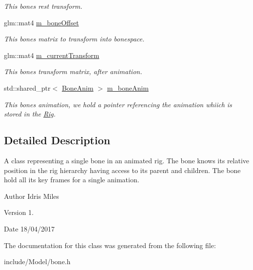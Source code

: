 \begin{DoxyCompactItemize}
\begin{DoxyCompactList}\small\item\em This bones rest transform. \end{DoxyCompactList}\item 
glm\+::mat4 \hyperlink{classBone_afb44f0a5108613343a6b4a03b0800791}{m\+\_\+bone\+Offset}\hypertarget{classBone_afb44f0a5108613343a6b4a03b0800791}{}\label{classBone_afb44f0a5108613343a6b4a03b0800791}

\begin{DoxyCompactList}\small\item\em This bones matrix to transform into bonespace. \end{DoxyCompactList}\item 
glm\+::mat4 \hyperlink{classBone_a45ed57a9660b47a42849775a4f8c7e64}{m\+\_\+current\+Transform}\hypertarget{classBone_a45ed57a9660b47a42849775a4f8c7e64}{}\label{classBone_a45ed57a9660b47a42849775a4f8c7e64}

\begin{DoxyCompactList}\small\item\em This bones transform matrix, after animation. \end{DoxyCompactList}\item 
std\+::shared\+\_\+ptr$<$ \hyperlink{structBoneAnim}{Bone\+Anim} $>$ \hyperlink{classBone_a2b79368d9a14bd038e534940a0911404}{m\+\_\+bone\+Anim}\hypertarget{classBone_a2b79368d9a14bd038e534940a0911404}{}\label{classBone_a2b79368d9a14bd038e534940a0911404}

\begin{DoxyCompactList}\small\item\em This bones animation, we hold a pointer referencing the animation whiich is stored in the \hyperlink{classRig}{Rig}. \end{DoxyCompactList}\end{DoxyCompactItemize}


\subsection{Detailed Description}
A class representing a single bone in an animated rig. The bone knows its relative position in the rig hierarchy having access to its parent and children. The bone hold all its key frames for a single animation. 

\begin{DoxyAuthor}{Author}
Idris Miles 
\end{DoxyAuthor}
\begin{DoxyVersion}{Version}
1. 
\end{DoxyVersion}
\begin{DoxyDate}{Date}
18/04/2017 
\end{DoxyDate}


The documentation for this class was generated from the following file\+:\begin{DoxyCompactItemize}
\item 
include/\+Model/bone.\+h\end{DoxyCompactItemize}

